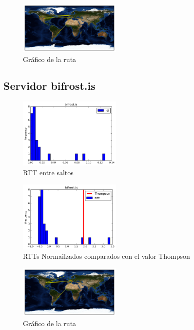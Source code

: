 \begin{figure}[H]
  \centering
    \includegraphics[width=0.45\textwidth]{grafico-rutas/www-uae-ma.png}
  \caption{Gráfico de la ruta}
  \label{entropia-s}
\end{figure}




\subsection{Servidor bifrost.is}
\begin{figure}[H]
  \centering
    \includegraphics[width=0.45\textwidth]{histogramas_rtt/bifrost-is.png}
  \caption{RTT entre saltos}
  \label{entropia-s}
\end{figure}

\begin{figure}[H]
  \centering
    \includegraphics[width=0.45\textwidth]{histogramas_thompson/bifrost-is.png}
  \caption{RTTs Normailzados comparados con el valor Thompson}
  \label{entropia-s}
\end{figure}

\begin{figure}[H]
  \centering
    \includegraphics[width=0.45\textwidth]{grafico-rutas/bifrost-is.png}
  \caption{Gráfico de la ruta}
  \label{entropia-s}
\end{figure}




